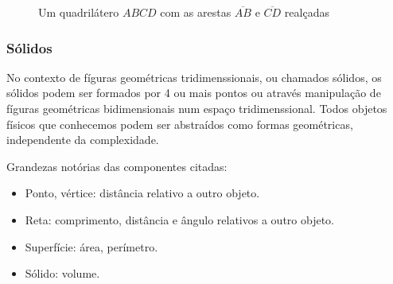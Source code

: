 \begin{multicols*}{2}
    \begin{figure}[H]
        \centering
        \caption{Um quadrilátero $ABCD$ com as arestas $\overline{AB}$ e $\overline{CD}$ realçadas}
    \end{figure}


    \subsubsection{Sólidos}
    No contexto de fíguras geométricas tridimenssionais, ou chamados sólidos, os sólidos podem ser formados por 4 ou
    mais pontos ou através manipulação de fíguras geométricas bidimensionais num espaço tridimenssional.
    Todos objetos físicos que conhecemos podem ser abstraídos como formas geométricas, independente da complexidade.

    Grandezas notórias das componentes citadas:
    \begin{itemize}
        \setlength\itemsep{1.15pt}
        \item Ponto, vértice: distância relativo a outro objeto.
        \item Reta: comprimento, distância e ângulo relativos a outro objeto.
        \item Superfície: área, perímetro.
        \item Sólido: volume.
    \end{itemize}


\end{multicols*}
